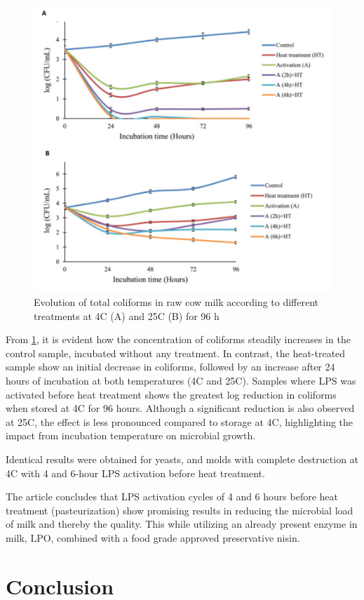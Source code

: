 \begin{figure}[h]
    \includegraphics[width=\linewidth]{Figures/fig_01.png}
    \caption{Evolution of total coliforms in raw cow milk according to different treatments at 4\textdegree C (A) and 25\textdegree C (B) for 96 h \cite{RM_02}}
    \label{fig_01}
\end{figure}

From \ref*{fig_01}, it is evident how the concentration of coliforms steadily increases in the control sample, incubated without any treatment. In contrast, the heat-treated sample show an initial decrease in coliforms, followed by an increase after 24 hours of incubation at both temperatures (4\textdegree C and 25\textdegree C). Samples where LPS was activated before heat treatment shows the greatest log reduction in coliforms when stored at 4\textdegree C for 96 hours. Although a significant reduction is also observed at 25\textdegree C, the effect is less pronounced compared to storage at 4\textdegree C, highlighting the impact from incubation temperature on microbial growth.

\vline

Identical results were obtained for yeasts, and molds with complete destruction at 4\textdegree C with 4 and 6-hour LPS activation before heat treatment. 

\vline

The article concludes that LPS activation cycles of 4 and 6 hours before heat treatment (pasteurization) show promising results in reducing the microbial load of milk and thereby the quality. This while utilizing an already present enzyme in milk, LPO, combined with a food grade approved preservative nisin.




\section{Conclusion}
